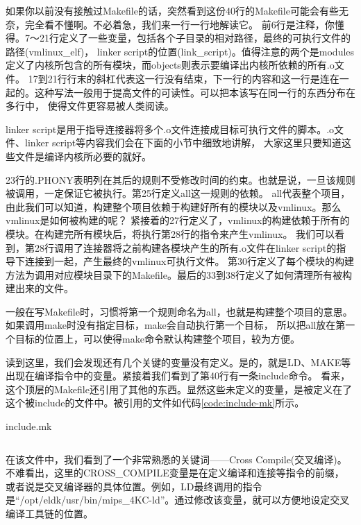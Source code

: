 如果你以前没有接触过Makefile的话，突然看到这份40行的Makefile可能会有些无奈，完全看不懂啊。不必着急，我们来一行一行地解读它。
前6行是注释，你懂得。7～21行定义了一些变量，包括各个子目录的相对路径，最终的可执行文件的路径(vmlinux\_elf)，
linker script的位置(link\_script)。值得注意的两个是modules定义了内核所包含的所有模块，而objects则表示要编译出内核所依赖的所有.o文件。
17到21行行末的斜杠代表这一行没有结束，下一行的内容和这一行是连在一起的。这种写法一般用于提高文件的可读性。可以把本该写在同一行的东西分布在多行中，
使得文件更容易被人类阅读。

\begin{note}
linker script是用于指导连接器将多个.o文件连接成目标可执行文件的脚本。.o文件、linker script等内容我们会在下面的小节中细致地讲解，
大家这里只要知道这些文件是编译内核所必要的就好。
\end{note}

23行的.PHONY表明列在其后的规则不受修改时间的约束。也就是说，一旦该规则被调用，一定保证它被执行。第25行定义all这一规则的依赖。
all代表整个项目，由此我们可以知道，构建整个项目依赖于构建好所有的模块以及vmlinux。那么vmlinux是如何被构建的呢？
紧接着的27行定义了，vmlinux的构建依赖于所有的模块。在构建完所有模块后，将执行第28行的指令来产生vmlinux。
我们可以看到，第28行调用了连接器将之前构建各模块产生的所有.o文件在linker script的指导下连接到一起，产生最终的vmlinux可执行文件。
第30行定义了每个模块的构建方法为调用对应模块目录下的Makefile。最后的33到38行定义了如何清理所有被构建出来的文件。

\begin{note}
一般在写Makefile时，习惯将第一个规则命名为all，也就是构建整个项目的意思。如果调用make时没有指定目标，make会自动执行第一个目标，
所以把all放在第一个目标的位置上，可以使得make命令默认构建整个项目，较为方便。
\end{note}

读到这里，我们会发现还有几个关键的变量没有定义。是的，就是LD、MAKE等出现在编译指令中的变量。紧接着我们看到了第40行有一条include命令。
看来，这个顶层的Makefile还引用了其他的东西。显然这些未定义的变量，是被定义在了这个被include的文件中。被引用的文件如代码\ref{code:include-mk}所示。

\begin{codeBoxWithCaption}{include.mk\label{code:include-mk}}
  \inputminted[linenos]{make}{codes/include.mk}
\end{codeBoxWithCaption}

在该文件中，我们看到了一个非常熟悉的关键词——Cross Compile(交叉编译)。不难看出，这里的CROSS\_COMPILE变量是在定义编译和连接等指令的前缀，
或者说是交叉编译器的具体位置。例如，LD最终调用的指令是“/opt/eldk/usr/bin/mips\_4KC-ld”。通过修改该变量，就可以方便地设定交叉编译工具链的位置。

